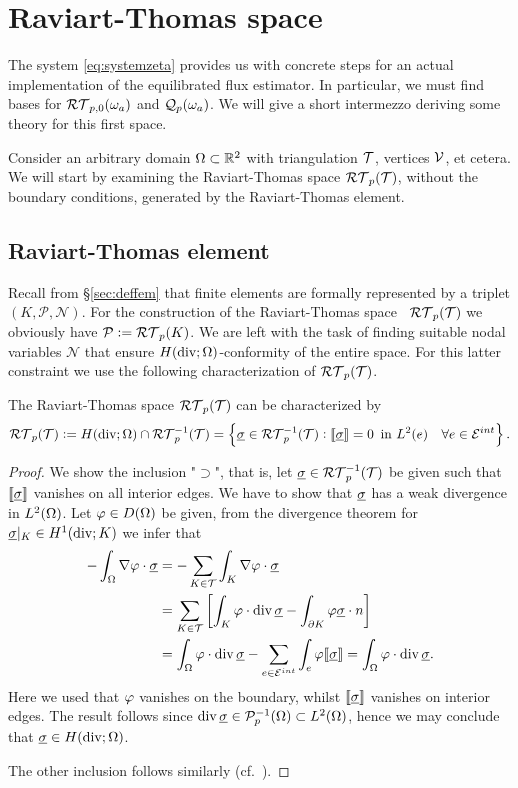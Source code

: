 \documentclass[thesis.tex]{subfiles}
\begin{document}
\section{Raviart-Thomas space}
The system \eqref{eq:systemzeta} provides us with concrete steps for an actual implementation of the equilibrated flux
estimator. In particular, we must find bases for $\mathcal{RT}_{p,0}(\omega_a)$ and $\mathcal{Q}_p(\omega_a)$. We will give a short
intermezzo deriving some theory for this first space. 

Consider an arbitrary domain $ \Omega \subset \mathbb{R}^2$ with triangulation $ \mathcal{T}$, vertices $ \mathcal{V}$, et cetera.
We will start by examining the Raviart-Thomas space $\mathcal{RT}_p( \mathcal{T})$, without the boundary conditions,
generated by the Raviart-Thomas element.

\subsection{Raviart-Thomas element}
Recall from \S\ref{sec:deffem} that finite elements are formally represented by a triplet $(K, \mathcal{P}, \mathcal{N})$. For
the construction of the Raviart-Thomas space ~$\mathcal{RT}_p( \mathcal{T})$
we obviously have ${\mathcal{P} := \mathcal{RT}_p(K)}$.
We are left with the task of finding suitable nodal variables $\mathcal{N}$ that ensure $H(\operatorname{div};  \Omega)$-conformity of the entire space.
For this latter constraint we use the following characterization of $\mathcal{RT}_p(\mathcal{T})$.
\begin{thm}
  \label{thm:rtjump}
  The Raviart-Thomas space $\mathcal{RT}_p( \mathcal{T})$  can be characterized by
  \[
    \mathcal{RT}_p( \mathcal{T}) := H(\operatorname{div};  \Omega) \cap \mathcal{RT}_p^{-1}( \mathcal{T})  = \set{\underline{\sigma}\in \mathcal{RT}_p^{-1}( \mathcal{T}) : \llbracket \underline{\sigma}\rrbracket = 0 \, \text{ in } L^2(e) \quad \forall e \in \mathcal{E}^{int}}.
  \]
\end{thm}
\begin{proof}
  We show the inclusion "$\supset$", that is, let $\underline{\sigma} \in \mathcal{RT}_p^{-1}( \mathcal{T})$ be given such that $\llbracket \underline{\sigma} \rrbracket$
  vanishes on all interior edges. We have to show that $\underline{\sigma}$ has a weak divergence in $L^2( \Omega)$.
  Let $\varphi \in D( \Omega)$ be given, from the divergence theorem for $\underline{\sigma}|_K \in H^1(\operatorname{div}; K)$ we infer that
  \begin{align*}
    - \int_{ \Omega}  \nabla \varphi \cdot \underline{\sigma} &= - \sum_{K \in  \mathcal{T}} \int_K \nabla \varphi \cdot \underline{\sigma} \\
    &=  \sum_{K \in  \mathcal{T}} \left[\int_K \varphi \cdot \operatorname{div} \underline{\sigma} - \int_{\partial K} \varphi \underline{\sigma} \cdot n\right]\\
    &=  \int_{ \Omega} \varphi \cdot \operatorname{div} \underline{\sigma} - \sum_{e \in  \mathcal{E}^{int}} \int_e \varphi \llbracket \underline{\sigma} \rrbracket = \int_{ \Omega} \varphi \cdot \operatorname{div} \underline{\sigma}.
  \end{align*}
  Here we used that $\varphi$ vanishes on the boundary, whilst $\llbracket \underline{\sigma} \rrbracket$ vanishes on interior edges.
  The result follows since $\operatorname{div} \underline{\sigma} \in \mathcal{P}_p^{-1}(\Omega) \subset  L^2( \Omega)$, hence we may conclude that $\underline{\sigma} \in H(\operatorname{div};  \Omega)$.

  The other inclusion follows similarly (cf.~\cite[Thm~3.2]{gaticasimple}).
\end{proof}
\end{document}

